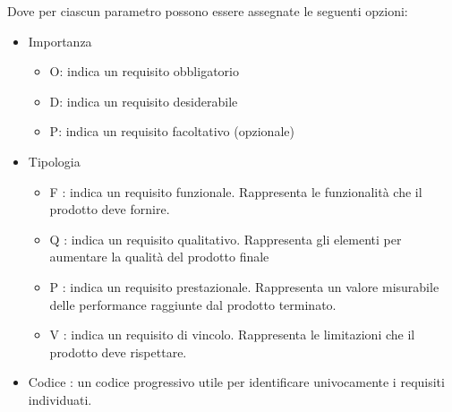 Dove per ciascun parametro possono essere assegnate le seguenti opzioni:
\begin{itemize}
	\item Importanza
	\begin{itemize}
		\item O: indica un requisito obbligatorio
		\item D: indica un requisito desiderabile
		\item P: indica un requisito facoltativo (opzionale)
	\end{itemize}
	\item Tipologia
	\begin{itemize}
		\item F : indica un requisito funzionale. Rappresenta le funzionalità che il prodotto
		deve fornire.
		\item Q : indica un requisito qualitativo. Rappresenta gli elementi per aumentare
		la qualità del prodotto finale
		\item  P : indica un requisito prestazionale. Rappresenta un valore misurabile delle
		performance raggiunte dal prodotto terminato.
		\item V : indica un requisito di vincolo. Rappresenta le limitazioni che il prodotto
		deve rispettare.
	\end{itemize}
	\item Codice : un codice progressivo utile per identificare univocamente i requisiti individuati.
\end{itemize}

